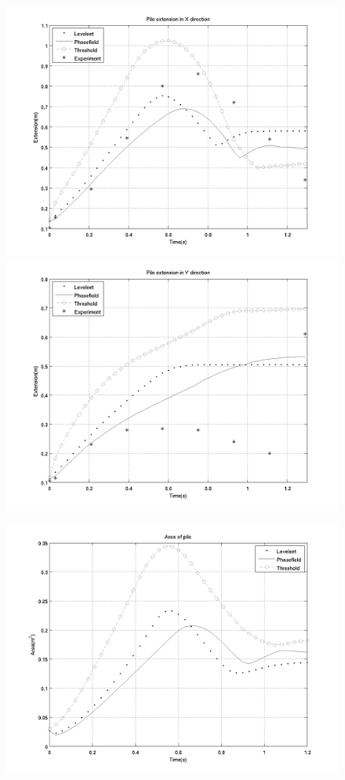 \documentclass[letterpaper,10pt]{article}
\begin{document}
\begin{figure}[H]
  \begin{minipage}[b]{.48\linewidth}
    \centering
    \includegraphics[scale=0.4]{IMAGES/xextend.png}
    \includegraphics[scale=0.4]{IMAGES/yextend.png}
  \end{minipage}
  \begin{minipage}[b]{.48 \linewidth}
    \centering
    \includegraphics[scale=0.4]{IMAGES/area.png}

\end{minipage}
\end{figure}
\end{document}
